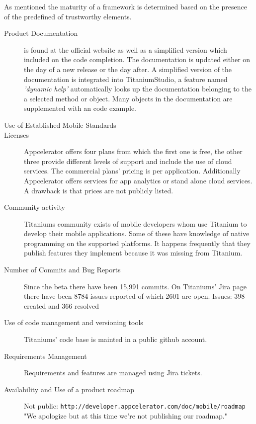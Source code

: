 As mentioned the maturity of a framework is determined based on the presence of the predefined of trustworthy elements.

\begin{description}
\item [Product Documentation] is found at the official website as well as a simplified version which included on the code completion. 
The documentation is updated either on the day of a new release or the day after. %
A simplified version of the documentation is integrated into TitaniumStudio, a feature named \emph{'dynamic help'} automatically looks up the documentation belonging to the a selected method or object.
Many objects in the documentation are supplemented with an code example.
\item [Use of Established Mobile Standards] 
\item [Licenses] Appcelerator offers four plans from which the first one is free, the other three provide different levels of support and include the use of cloud services. The commercial plans' pricing is per application. Additionally Appcelerator offers services for app analytics or stand alone cloud services. A drawback is that prices are not publicly listed.
\item [Community activity] Titaniums community exists of mobile developers whom use Titanium to develop their mobile applications. Some of these have knowledge of native programming on the supported platforms. It happens frequently that they publish features they implement because it was missing from Titanium. 
\item [Number of Commits and Bug Reports] Since the beta there have been 15,991 commits. %
On Titaniums' Jira page there have been 8784 issues reported of which 2601 are open.
Issues: 398 created and 366 resolved
\item [Use of code management and versioning tools] Titaniums' code base is mainted in a public github account.%
\item [Requirements Management] Requirements and features are managed using Jira tickets.
\item [Availability and Use of a product roadmap] Not public:
\texttt{http://developer.appcelerator.com/doc/mobile/roadmap}
"We apologize but at this time we're not publishing our roadmap."
\end{description}

